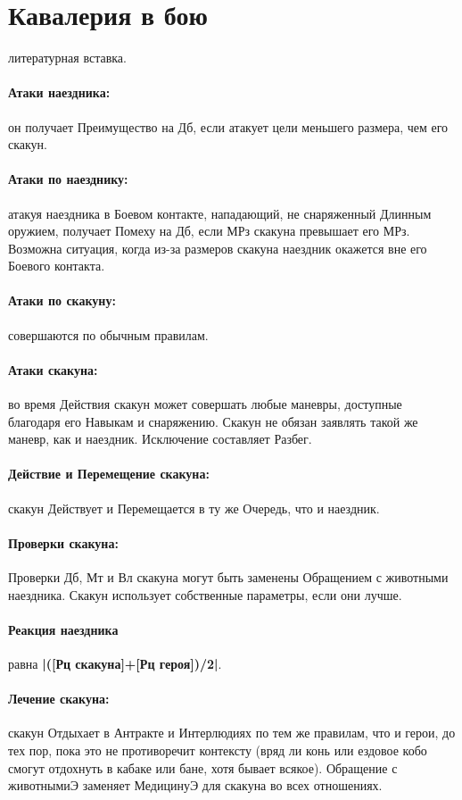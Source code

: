 \section{Кавалерия в бою}
\tbd литературная вставка.
\paragraph{Атаки наездника:} он получает Преимущество на Дб, если атакует цели меньшего размера, чем его скакун.
\paragraph{Атаки по наезднику:} атакуя наездника в Боевом контакте, нападающий, не снаряженный Длинным оружием, получает Помеху на Дб, если МРз скакуна превышает его МРз. Возможна ситуация, когда из-за размеров скакуна наездник окажется вне его Боевого контакта.
\paragraph{Атаки по скакуну:} совершаются по обычным правилам.
\paragraph{Атаки скакуна:} во время Действия скакун может совершать любые маневры, доступные благодаря его Навыкам и снаряжению. Скакун не обязан заявлять такой же маневр, как и наездник. Исключение составляет Разбег.
\paragraph{Действие и Перемещение скакуна:} скакун Действует и Перемещается в ту же Очередь, что и наездник.
\paragraph{Проверки скакуна:} Проверки Дб, Мт и Вл скакуна могут быть заменены Обращением с животными наездника. Скакун использует собственные параметры, если они лучше.
\paragraph{Реакция наездника} равна \textbf{|([Рц скакуна]+[Рц героя])/2|}.
\paragraph{Лечение скакуна:} скакун Отдыхает в Антракте и Интерлюдиях по тем же правилам, что и герои, до тех пор, пока это не противоречит контексту (вряд ли конь или ездовое кобо смогут отдохнуть в кабаке или бане, хотя бывает всякое). Обращение с животнымиЭ заменяет МедицинуЭ для скакуна во всех отношениях.

